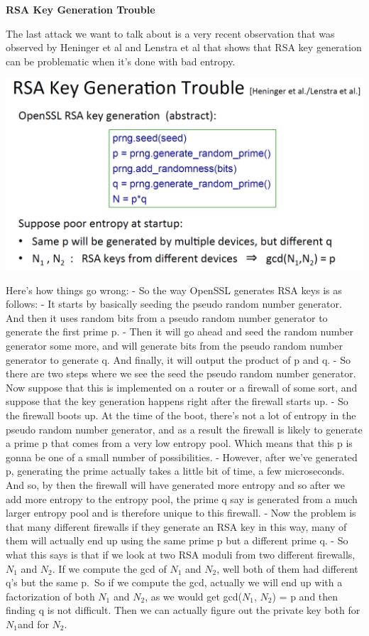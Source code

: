 \documentclass[11pt]{article}
\makeatletter
\def\maxwidth{\ifdim\Gin@nat@width>\linewidth\linewidth
    \else\Gin@nat@width\fi}
\let\Oldincludegraphics\includegraphics
\renewcommand{\includegraphics}[1]{\Oldincludegraphics[width=.8\maxwidth]{#1}}
\makeatother
\begin{document}
\textbf{RSA Key Generation Trouble}

The last attack we want to talk about is a very recent observation that
was observed by Heninger et al and Lenstra et al that shows that RSA key
generation can be problematic when it's done with bad entropy.

\includegraphics{./Images/RSA-KeyGenTroub.png}

Here's how things go wrong: - So the way OpenSSL generates RSA keys is
as follows: - It starts by basically seeding the pseudo random number
generator. And then it uses random bits from a pseudo random number
generator to generate the first prime p. - Then it will go ahead and
seed the random number generator some more, and will generate bits from
the pseudo random number generator to generate q. And finally, it will
output the product of p and q. - So there are two steps where we see the
seed the pseudo random number generator. Now suppose that this is
implemented on a router or a firewall of some sort, and suppose that the
key generation happens right after the firewall starts up. - So the
firewall boots up. At the time of the boot, there's not a lot of entropy
in the pseudo random number generator, and as a result the firewall is
likely to generate a prime p that comes from a very low entropy pool.
Which means that this p is gonna be one of a small number of
possibilities. - However, after we've generated p, generating the prime
actually takes a little bit of time, a few microseconds. And so, by then
the firewall will have generated more entropy and so after we add more
entropy to the entropy pool, the prime q say is generated from a much
larger entropy pool and is therefore unique to this firewall. - Now the
problem is that many different firewalls if they generate an RSA key in
this way, many of them will actually end up using the same prime p but a
different prime q. - So what this says is that if we look at two RSA
moduli from two different firewalls, \(N_{1}\) and \(N_{2}\). If we
compute the gcd of \(N_{1}\) and \(N_{2}\), well both of them had
different q's but the same p.~So if we compute the gcd, actually we will
end up with a factorization of both \(N_{1}\) and \(N_{2}\), as we would
get gcd(\(N_{1}\), \(N_{2}\)) = p and then finding q is not difficult.
Then we can actually figure out the private key both for \(N_{1}\)and
for \(N_{2}\).
\end{document}
